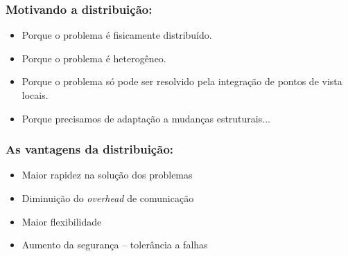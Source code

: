 

\begin{frame} %


\frametitle{Motivando a distribuição:}

\begin{itemize}
  \item Porque o problema é fisicamente distribuído.
  \item Porque o problema é heterogêneo.
  \item Porque o problema só pode ser resolvido pela integração de pontos de vista locais.
  \item Porque precisamos de adaptação a mudanças estruturais...

\end{itemize}

\end{frame}




\begin{frame} %

\frametitle{As vantagens da distribuição:}

\begin{itemize}
  \item Maior rapidez na solução dos problemas
  \item Diminuição do \textit{overhead} de comunicação
  \item Maior flexibilidade
  \item Aumento da segurança -- tolerância a falhas
\end{itemize}

\end{frame}





